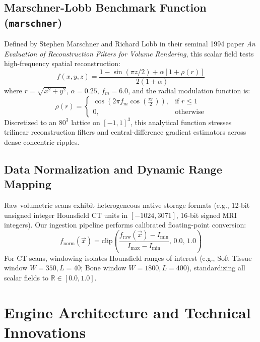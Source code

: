 \documentclass[10pt,twocolumn,a4paper]{article}
\begin{document}
\subsection{Marschner-Lobb Benchmark Function (\texttt{marschner})}
Defined by Stephen Marschner and Richard Lobb in their seminal 1994 paper \textit{An Evaluation of Reconstruction Filters for Volume Rendering}, this scalar field tests high-frequency spatial reconstruction:
\begin{equation}
f(x, y, z) = \frac{1 - \sin(\pi z / 2) + \alpha [1 + \rho(r)]}{2 (1 + \alpha)}
\end{equation}
where $r = \sqrt{x^2 + y^2}$, $\alpha = 0.25$, $f_m = 6.0$, and the radial modulation function is:
\begin{equation}
\rho(r) = \begin{cases}
\cos\left(2\pi f_m \cos\left(\frac{\pi r}{2}\right)\right), & \text{if } r \le 1 \\
0, & \text{otherwise}
\end{cases}
\end{equation}
Discretized to an $80^3$ lattice on $[-1, 1]^3$, this analytical function stresses trilinear reconstruction filters and central-difference gradient estimators across dense concentric ripples.

\subsection{Data Normalization and Dynamic Range Mapping}
Raw volumetric scans exhibit heterogeneous native storage formats (e.g., 12-bit unsigned integer Hounsfield CT units in $[-1024, 3071]$, 16-bit signed MRI integers). Our ingestion pipeline performs calibrated floating-point conversion:
\begin{equation}
f_{\text{norm}}(\vec{x}) = \text{clip}\left(\frac{f_{\text{raw}}(\vec{x}) - I_{\text{min}}}{I_{\text{max}} - I_{\text{min}}}, \, 0.0, \, 1.0\right)
\end{equation}
For CT scans, windowing isolates Hounsfield ranges of interest (e.g., Soft Tissue window $W=350, L=40$; Bone window $W=1800, L=400$), standardizing all scalar fields to $\mathbb{R} \in [0.0, 1.0]$.

\section{Engine Architecture and Technical Innovations}
\end{document}
